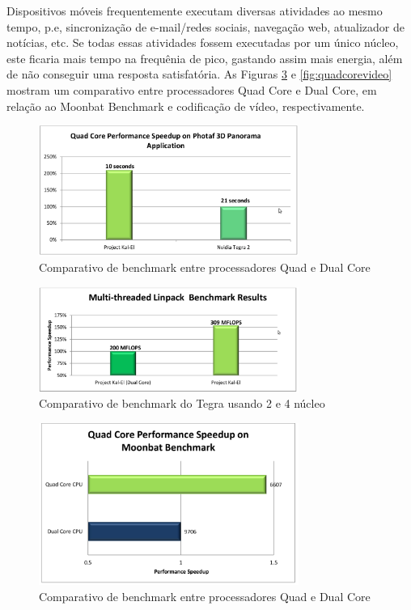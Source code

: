 \documentclass[article]{IEEEtran}
\begin{document}
Dispositivos m\'oveis frequentemente executam diversas atividades ao mesmo tempo, p.e, sincroniza\c{c}\~ao de e-mail/redes sociais, navega\c{c}\~ao web, atualizador de not\'icias, etc. Se todas essas atividades fossem executadas por um \'unico n\'ucleo, este ficaria mais tempo na frequ\^enia de pico, gastando assim mais energia, al\'em de n\~ao conseguir uma resposta satisfat\'oria. As Figuras \ref{fig:quadcorebenchmark} e \ref{fig:quadcorevideo} mostram um comparativo entre processadores Quad Core e Dual Core, em rela\c{c}\~ao ao Moonbat Benchmark e codifica\c{c}\~ao de v\'ideo, respectivamente.

\begin{figure}[ht]
  \centering
  \includegraphics[width=8.5cm]{./pictures/QaudCorePhota.png}
  \caption{Comparativo de benchmark entre processadores Quad e Dual Core}
  \label{fig:quadcorephota}
\end{figure}

\begin{figure}[ht]
  \centering
  \includegraphics[width=8.5cm]{./pictures/MultiThread.png}
  \caption{Comparativo de benchmark do Tegra usando 2 e 4 n\'ucleo}
  \label{fig:multithread}
\end{figure}

\begin{figure}[ht]
  \centering
  \includegraphics[width=8.5cm]{./pictures/QuadCoreBenchmark.png}
  \caption{Comparativo de benchmark entre processadores Quad e Dual Core}
  \label{fig:quadcorebenchmark}
\end{figure}
\end{document}
